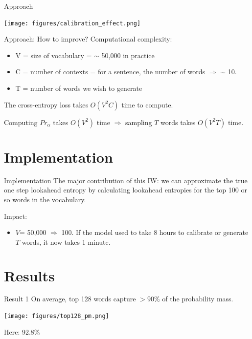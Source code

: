 \documentclass{beamer}
\begin{document}
\begin{frame}{Approach}
    \begin{center}
        \texttt{[image: figures/calibration\_effect.png]}
    \end{center}
\end{frame}

\begin{frame}{Approach: How to improve?}
Computational complexity:
\begin{itemize}
    \item V = size of vocabulary = $\sim$ 50,000 in practice
    \item C = number of contexts = for a sentence, the number of words $\Rightarrow$ $\sim$ 10. 
    \item T = number of words we wish to generate
\end{itemize}
\pause
The cross-entropy loss takes $O(V^2C)$ time to compute. 

Computing $Pr_\alpha$ takes $O(V^2)$ time $\Rightarrow$ sampling $T$ words takes $O(V^2T)$ time.
\end{frame}

\section{Implementation}
\begin{frame}{Implementation}
    The major contribution of this IW: we can approximate the true one step lookahead entropy by calculating lookahead entropies for the top 100 or so words in the vocabulary.
    \pause

    Impact:
    \begin{itemize}
        \item $V$= 50,000 $\Rightarrow$ 100. If the model used to take 8 hours to calibrate or generate $T$ words, it now takes 1 minute.
    \end{itemize}
\end{frame}

\section{Results}
\begin{frame}{Result 1}
    On average, top 128 words capture $>90\%$ of the probability mass.
    \begin{center}
        \texttt{[image: figures/top128\_pm.png]}
    \end{center}
    Here: 92.8\%
\end{frame}
\end{document}
